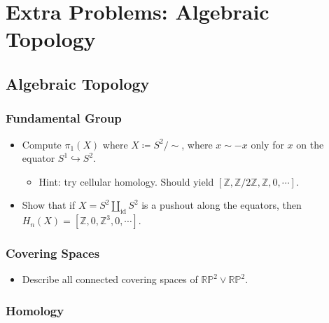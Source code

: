 \hypertarget{extra-problems-algebraic-topology}{%
\section{Extra Problems: Algebraic
Topology}\label{extra-problems-algebraic-topology}}

\hypertarget{algebraic-topology}{%
\subsection{Algebraic Topology}\label{algebraic-topology}}

\hypertarget{fundamental-group}{%
\subsubsection{Fundamental Group}\label{fundamental-group}}

\begin{itemize}
\tightlist
\item
  Compute \(\pi_1(X)\) where \(X \coloneqq S^2/\sim\), where
  \(x\sim -x\) only for \(x\) on the equator
  \(S^1 \hookrightarrow S^2\).

  \begin{itemize}
  \tightlist
  \item
    Hint: try cellular homology. Should yield
    \([{\mathbb{Z}}, {\mathbb{Z}}/2{\mathbb{Z}}, {\mathbb{Z}}, 0, \cdots]\).
  \end{itemize}
\item
  Show that if \(X = S^2 {\textstyle\coprod}_{\operatorname{id}} S^2\)
  is a pushout along the equators, then
  \(H_n(X) = [{\mathbb{Z}}, 0, {\mathbb{Z}}^3, 0, \cdots]\).
\end{itemize}

\hypertarget{covering-spaces-1}{%
\subsubsection{Covering Spaces}\label{covering-spaces-1}}

\begin{itemize}
\tightlist
\item
  Describe all connected covering spaces of
  \({\mathbb{RP}}^2 \vee {\mathbb{RP}}^2\).
\end{itemize}

\hypertarget{homology}{%
\subsubsection{Homology}\label{homology}}

